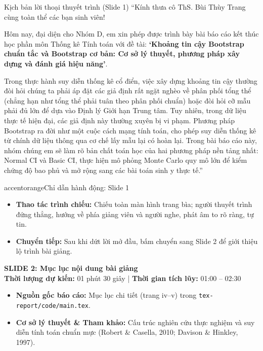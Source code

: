 \documentclass[10pt,a4paper]{article}
\newcommand{\slideheader}[4]{
    \vspace{0.4cm}
    \begin{tcolorbox}[colback=primary!7!white, colframe=primary, arc=2mm, boxrule=1pt, left=4mm, right=4mm, top=2.5mm, bottom=2.5mm]
        {\Large\bfseries\color{primary} SLIDE #1: #2}\\[0.1cm]
        {\small\textbf{Thời lượng dự kiến:} #3 \quad | \quad \textbf{Thời gian tích lũy:} #4}
    \end{tcolorbox}
    \vspace{0.15cm}
}
\begin{document}
\begin{scriptbox}{Kịch bản lời thoại thuyết trình (Slide 1)}
    ``Kính thưa cô ThS. Bùi Thùy Trang cùng toàn thể các bạn sinh viên! 
    
    Hôm nay, đại diện cho Nhóm D, em xin phép được trình bày bài báo cáo kết thúc học phần môn Thống kê Tính toán với đề tài: \textbf{`Khoảng tin cậy Bootstrap chuẩn tắc và Bootstrap cơ bản: Cơ sở lý thuyết, phương pháp xây dựng và đánh giá hiệu năng'}.
    
    Trong thực hành suy diễn thống kê cổ điển, việc xây dựng khoảng tin cậy thường đòi hỏi chúng ta phải áp đặt các giả định rất ngặt nghèo về phân phối tổng thể (chẳng hạn như tổng thể phải tuân theo phân phối chuẩn) hoặc đòi hỏi cỡ mẫu phải đủ lớn để dựa vào Định lý Giới hạn Trung tâm. Tuy nhiên, trong dữ liệu thực tế hiện đại, các giả định này thường xuyên bị vi phạm. Phương pháp Bootstrap ra đời như một cuộc cách mạng tính toán, cho phép suy diễn thống kê từ chính dữ liệu thông qua cơ chế lấy mẫu lại có hoàn lại. Trong bài báo cáo này, nhóm chúng em sẽ làm rõ bản chất toán học của hai phương pháp nền tảng nhất: Normal CI và Basic CI, thực hiện mô phỏng Monte Carlo quy mô lớn để kiểm chứng độ bao phủ và mở rộng sang các bài toán sinh y thực tế.''
\end{scriptbox}

\begin{actionbox}{accentorange}{Chỉ dẫn hành động: Slide 1}
    \begin{itemize}
        \item \textbf{Thao tác trình chiếu:} Chiếu toàn màn hình trang bìa; người thuyết trình đứng thẳng, hướng về phía giảng viên và người nghe, phát âm to rõ ràng, tự tin.
        \item \textbf{Chuyển tiếp:} Sau khi dứt lời mở đầu, bấm chuyển sang Slide 2 để giới thiệu lộ trình bài giảng.
    \end{itemize}
\end{actionbox}

\slideheader{2}{Mục lục nội dung bài giảng}{01 phút 30 giây}{01:00 -- 02:30}

\begin{itemize}
    \item \textbf{Nguồn gốc báo cáo:} Mục lục chi tiết (trang iv--v) trong \texttt{tex-report/code/main.tex}.
    \item \textbf{Cơ sở lý thuyết \& Tham khảo:} Cấu trúc nghiên cứu thực nghiệm và suy diễn tính toán chuẩn mực (Robert \& Casella, 2010; Davison \& Hinkley, 1997).
\end{itemize}
\end{document}
